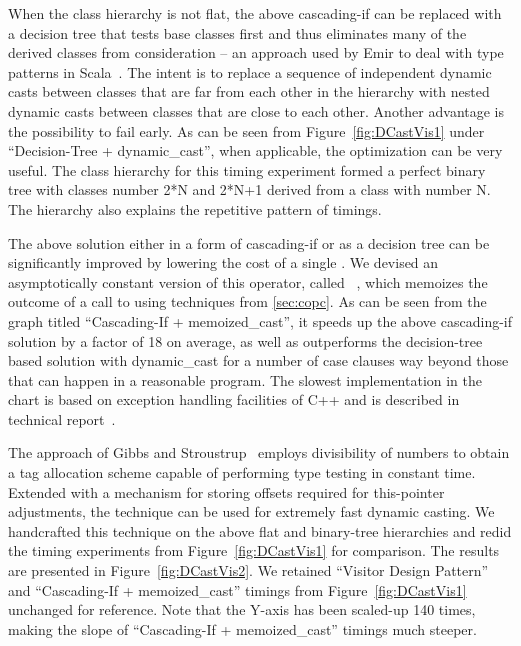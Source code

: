 When the class hierarchy is not flat, the above cascading-if can be replaced 
with a decision tree that tests base classes first and thus eliminates many of 
the derived classes from consideration -- an approach used by Emir to deal with 
type patterns in Scala~\cite[]{EmirThesis}. The intent is to 
replace a sequence of independent dynamic casts between classes that are far 
from each other in the hierarchy with nested dynamic casts between classes that 
are close to each other. Another advantage is the possibility to fail early. 
As can be seen from Figure~\ref{fig:DCastVis1} under ``Decision-Tree + 
dynamic\_cast'', when applicable, the optimization can be very useful. The class
hierarchy for this timing experiment formed a perfect binary tree with 
classes number 2*N and 2*N+1 derived from a class with number N. The hierarchy 
also explains the repetitive pattern of timings.

The above solution either in a form of cascading-if or as a decision tree can be 
significantly improved by lowering the cost of a single . 
We devised an asymptotically constant version of this operator, called
~\cite{TR}, which memoizes the outcome of a call to 
 using techniques from \textsection\ref{sec:copc}. As can be 
seen from the graph titled ``Cascading-If + memoized\_cast'', it speeds up the 
above cascading-if solution by a factor of 18 on average, as well as outperforms 
the decision-tree based solution with dynamic\_cast for a number of case clauses 
way beyond those that can happen in a reasonable program. The slowest 
implementation in the chart is based on exception handling facilities of C++ and 
is described in technical report~\cite{TR}.

The approach of Gibbs and Stroustrup~\cite{FastDynCast} employs divisibility of 
numbers to obtain a tag allocation scheme capable of performing type testing in 
constant time. Extended with a mechanism for storing offsets required for 
this-pointer adjustments, the technique can be used for extremely fast dynamic 
casting. We handcrafted this technique on the above flat 
and binary-tree hierarchies and redid the timing experiments from 
Figure~\ref{fig:DCastVis1} for comparison. The results are 
presented in Figure~\ref{fig:DCastVis2}. We retained 
``Visitor Design Pattern'' and ``Cascading-If + memoized\_cast'' timings from 
Figure~\ref{fig:DCastVis1} unchanged for reference. Note that the Y-axis has been scaled-up 
140 times, making the slope of ``Cascading-If + memoized\_cast'' timings much steeper.

